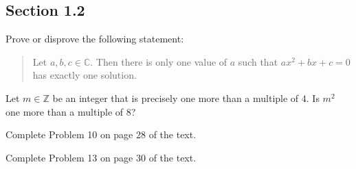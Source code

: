 \documentclass[addpoints,11pt]{exam}
\newcommand{\ZZ}{\mathbb{Z}}
\newcommand{\CC}{\mathbb{C}}
\begin{document}
\begin{questions}
\section*{Section 1.2}
  \question
  Prove or disprove the following statement:
  \begin{quote}
    Let $a,b,c\in\CC$.
    Then there is only one value of $a$ such that $ax^{2} + bx + c = 0$ has exactly one solution.
  \end{quote}

  \vspace{.5cm}

  \question
  Let $m\in\ZZ$ be an integer that is precisely one more than a multiple of $4$.
  Is $m^{2}$ one more than a multiple of $8$?

  \vspace{.5cm}

  \question
  Complete Problem 10 on page 28 of the text.

  \vspace{.5cm}

  \question
  Complete Problem 13 on page 30 of the text.
\end{questions}
\end{document}
